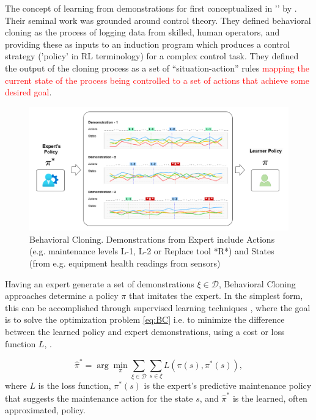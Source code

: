 \documentclass{article}
\begin{document}
The concept of learning from demonstrations for first conceptualized in '' by \cite{BC-bain1995}. Their seminal work was grounded around control theory. They defined behavioral cloning as the process of logging data from skilled, human operators, and providing these as inputs to an induction program which produces a control strategy ('policy' in RL terminology) for a complex control task. They defined the output of the cloning process as a set of ``situation-action'' rules \textcolor{red}{mapping the current state of the process being controlled to a set of actions that achieve some desired goal}.

\begin{figure}
\centering
\includegraphics[width=\linewidth]{images/BC_Diagram.png}
\caption{Behavioral Cloning. Demonstrations from Expert include Actions (e.g. maintenance levels L-1, L-2 or Replace tool *R*) and States (from e.g. equipment health readings from sensors)}
\label{fig:BC}
\end{figure}

Having an expert generate a set of demonstrations $\xi \in \mathcal{D}$, Behavioral Cloning approaches determine a policy $\pi$ that imitates the expert. In the simplest form, this can be accomplished through supervised learning techniques \citep{abbeel2004apprenticeship, yue2018imitation}, where the goal is to solve the optimization problem \eqref{eq:BC} i.e. to minimize the difference between the learned policy and expert demonstrations, using a cost or loss function $L$, \citep{stanford-lectures}.  

\begin{equation}\label{eq:BC}
\hat{\pi}^* = \arg\min_{\pi} \sum_{\xi \in \mathcal{D}} \sum_{s \in \xi} L(\pi(s), \pi^*(s)),
\end{equation}
where $L$ is the loss function, $\pi^*(s)$ is the expert's predictive maintenance policy that suggests the maintenance action for the state $s$, and $\hat{\pi}^*$ is the learned, often approximated, policy.
\end{document}
